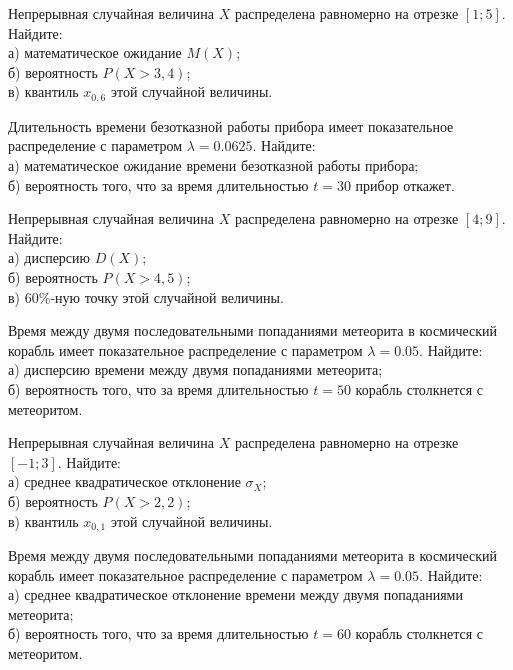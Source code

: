 \vfill

\newpage\setcounter{zad}{0}

\z Непрерывная случайная величина $X$ распределена равномерно на отрезке $[1; 5]$. Найдите: \\ \quad а) математическое ожидание $M(X)$; \\ \quad б) вероятность $P(X>3{,}4)$; \\ \quad в) квантиль $x_{0{,}6}$ этой случайной величины.


\vfill

\z Длительность времени безотказной работы прибора имеет показательное распределение с параметром $\lambda = 0.0625$. Найдите: \\ \quad а) математическое ожидание времени безотказной работы прибора; \\ \quad б) вероятность того, что за время длительностью $t = 30$ прибор  откажет.
 

\vfill

\newpage\setcounter{zad}{0}

\z Непрерывная случайная величина $X$ распределена равномерно на отрезке $[4; 9]$. Найдите: \\ \quad а) дисперсию $D(X)$; \\ \quad б) вероятность $P(X>4{,}5)$; \\ \quad в) $60\%$-ную точку этой случайной величины.


\vfill

\z Время между двумя последовательными попаданиями метеорита в космический корабль имеет показательное распределение с параметром $\lambda = 0.05$. Найдите: \\ \quad а) дисперсию времени между двумя попаданиями метеорита; \\ \quad б) вероятность того, что за время длительностью $t = 50$ корабль  столкнется с метеоритом.
 

\vfill

\newpage\setcounter{zad}{0}

\z Непрерывная случайная величина $X$ распределена равномерно на отрезке $[-1; 3]$. Найдите: \\ \quad а) среднее квадратическое отклонение $\sigma_X$; \\ \quad б) вероятность $P(X>2{,}2)$; \\ \quad в) квантиль $x_{0{,}1}$ этой случайной величины.


\vfill

\z Время между двумя последовательными попаданиями метеорита в космический корабль имеет показательное распределение с параметром $\lambda = 0.05$. Найдите: \\ \quad а) среднее квадратическое отклонение времени между двумя попаданиями метеорита; \\ \quad б) вероятность того, что за время длительностью $t = 60$ корабль  столкнется с метеоритом.
 

